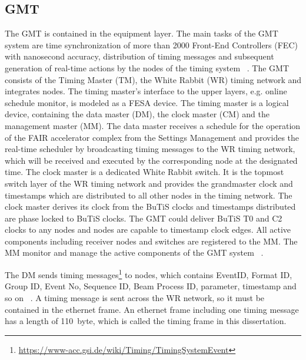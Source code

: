 \subsection{GMT}
The GMT is contained in the equipment layer. The main tasks of the GMT system are time synchronization of more than 2000 Front-End Controllers (\gls{FEC}) with nanosecond accuracy, distribution of timing messages and subsequent generation of real-time actions by the nodes of the timing system ~\cite{beck_new_2012}. The GMT consists of the Timing Master (\gls{TM}), the White Rabbit (WR) timing network and integrates nodes. The timing master's interface to the upper layers, e.g. online schedule monitor, is modeled as a FESA device. The timing master is a logical device, containing the data master (\gls{DM}), the clock master (\gls{CM}) and the management master (\gls{MM}). The data master receives a schedule for the operation of the FAIR accelerator complex from the Settings Management and provides the real-time scheduler by broadcasting timing messages to the WR timing network, which will be received and executed by the corresponding node at the designated time. The clock master is a dedicated White Rabbit switch. It is the topmost switch layer of the WR timing network and provides the grandmaster clock and timestamps which are distributed to all other nodes in the timing network. The clock master derives its clock from the BuTiS clocks and timestamps distributed are phase locked to BuTiS clocks. The GMT could deliver BuTiS T0 and C2 clocks to any nodes and nodes are capable to timestamp clock edges. All active components including receiver nodes and switches are registered to the MM. The MM monitor and manage the active components of the GMT system ~\cite{beck_general_????}.

The DM sends timing messages\footnote{\url{https://www-acc.gsi.de/wiki/Timing/TimingSystemEvent}} to nodes, which contains EventID, Format ID, Group ID, Event No, Sequence ID, Beam Process ID, parameter, timestamp and so on ~\cite{beck_timing_2015}. A timing message is sent across the WR network, so it must be contained in the ethernet frame. An ethernet frame including one timing message has a length of \SI{110}{byte}, which is called the timing frame in this dissertation.

